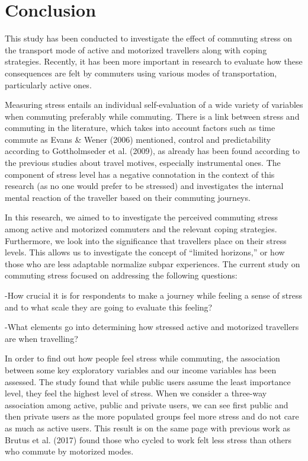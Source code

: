 \documentclass[
11pt, %
oneside, %
english, %
singlespacing, %
]{macthesis} %
\begin{document}
\hypertarget{conclusion}{%
\section{Conclusion}\label{conclusion}}

This study has been conducted to investigate the effect of commuting stress on the transport mode of active and motorized travellers along with coping strategies. Recently, it has been more important in research to evaluate how these consequences are felt by commuters using various modes of transportation, particularly active ones.

Measuring stress entails an individual self-evaluation of a wide variety of variables when commuting preferably while commuting. There is a link between stress and commuting in the literature, which takes into account factors such as time commute as Evans \& Wener (2006) mentioned, control and predictability according to Gottholmseder et al. (2009), as already has been found according to the previous studies about travel motives, especially instrumental ones. The component of stress level has a negative connotation in the context of this research (as no one would prefer to be stressed) and investigates the internal mental reaction of the traveller based on their commuting journeys.

In this research, we aimed to to investigate the perceived commuting stress among active and motorized commuters and the relevant coping strategies. Furthermore, we look into the significance that travellers place on their stress levels. This allows us to investigate the concept of ``limited horizons,'' or how those who are less adaptable normalize subpar experiences. The current study on commuting stress focused on addressing the following questions:

-How crucial it is for respondents to make a journey while feeling a sense of stress and to what scale they are going to evaluate this feeling?

-What elements go into determining how stressed active and motorized travellers are when travelling?

In order to find out how people feel stress while commuting, the association between some key exploratory variables and our income variables has been assessed. The study found that while public users assume the least importance level, they feel the highest level of stress. When we consider a three-way association among active, public and private users, we can see first public and then private users as the more populated groups feel more stress and do not care as much as active users. This result is on the same page with previous work as Brutus et al. (2017) found those who cycled to work felt less stress than others who commute by motorized modes.
\end{document}
